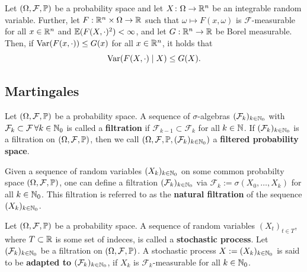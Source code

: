 \begin{proposition}[Monotonicity]
    \label{prop:conditional-variance-properties}
    Let $(\Omega, \mathcal{F}, \mathbb{P})$ be a probability space and
    let $X\colon \Omega \to \mathbb{R}^n$ be an integrable random variable.
    Further, let $F:\mathbb{R}^n\times \Omega\to\mathbb{R}$ such that
    $\omega\mapsto F(x, \omega)$ is $\mathcal{F}$-measurable for all $x\in\mathbb{R}^n$ and $\mathbb{E}(F(X,\cdot)^2) < \infty$, and let $G:\mathbb{R}^n\to\mathbb{R}$
    be Borel measurable. Then, if $\operatorname{Var}(F(x, \cdot)) \leq G(x)$ for all $x\in\mathbb{R}^n$, it holds that
    \[
        \operatorname{Var}(F(X, \cdot) \mid X) \leq G(X).
    \]
\end{proposition}

\subsection{Martingales}

\begin{definition}[Filtration]
    Let $(\Omega, \mathcal{F}, \mathbb{P})$ be a probability space. A sequence
    of $\sigma$-algebras $(\mathcal{F}_k)_{k\in\mathbb{N}_0}$ with
    $\mathcal{F}_k \subset \mathcal{F} \, \forall k\in\mathbb{N}_0$
    is called a \textbf{filtration} if $\mathcal{F}_{k-1} \subset \mathcal{F}_{k}$
    for all $k\in\mathbb{N}$. If $(\mathcal{F}_k)_{k\in\mathbb{N}_0}$ is a filtration on
    $(\Omega, \mathcal{F}, \mathbb{P})$, then we call
    $(\Omega, \mathcal{F}, \mathbb{P}, (\mathcal{F}_k)_{k\in\mathbb{N}_0})$ a \textbf{filtered probability space}.
\end{definition}

\begin{example}
    Given a sequence of random variables $(X_k)_{k\in\mathbb{N}_0}$ on some common probabilty
    space $(\Omega, \mathcal{F}, \mathbb{P})$, one can define a filtration
    $(\mathcal{F}_k)_{k\in\mathbb{N}_0}$ via $\mathcal{F}_k := \sigma(X_0, \dots, X_k)$ for all $k\in\mathbb{N}_0$.
    This filtration is referred to as the \textbf{natural filtration}
    of the sequence $(X_k)_{k\in\mathbb{N}_0}$.
\end{example}

\begin{definition}
    Let $(\Omega, \mathcal{F}, \mathbb{P})$ be a probability space. A
    sequence of random variables $(X_t)_{t\in T}$, where $T \subset \mathbb{R}$
    is some set of indeces, is called a
    \textbf{stochastic process}.
    Let $(\mathcal{F}_k)_{k\in\mathbb{N}_0}$ be a filtration on
    $(\Omega, \mathcal{F}, \mathbb{P})$. A stochastic process $X := (X_k)_{k\in\mathbb{N}_0}$
    is said to be \textbf{adapted to $(\mathcal{F}_k)_{k\in\mathbb{N}_0}$}, if
    $X_k$ is $\mathcal{F}_k$-measurable for all $k\in\mathbb{N}_0$. 
\end{definition}

